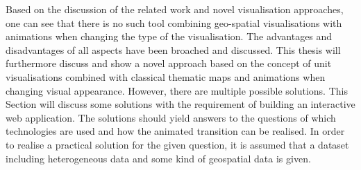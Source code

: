 Based on the discussion of the related work and novel visualisation approaches, one can see that there is no such tool combining geo-spatial visualisations with animations when changing the type of the visualisation. The advantages and disadvantages of all aspects have been broached and discussed. This thesis will furthermore discuss and show a novel approach based on the concept of unit visualisations combined with classical thematic maps and animations when changing visual appearance. However, there are multiple possible solutions. This Section will discuss some solutions with the requirement of building an interactive web application. The solutions should yield answers to the questions of which technologies are used and how the animated transition can be realised.
In order to realise a practical solution for the given question, it is assumed that a dataset including heterogeneous data and some kind of geospatial data is given.

